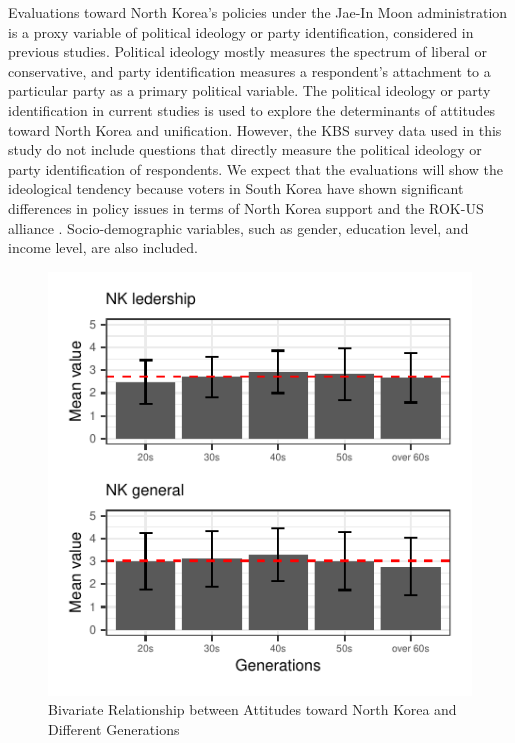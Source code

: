 \documentclass[letterpaper,9pt,twocolumn,twoside,]{pinp}
\begin{document}
Evaluations toward North Korea's policies under the Jae-In Moon
administration is a proxy variable of political ideology or party
identification, considered in previous studies. Political ideology
mostly measures the spectrum of liberal or conservative, and party
identification measures a respondent's attachment to a particular party
as a primary political variable. The political ideology or party
identification in current studies is used to explore the determinants of
attitudes toward North Korea and unification. However, the KBS survey
data used in this study do not include questions that directly measure
the political ideology or party identification of respondents. We expect
that the evaluations will show the ideological tendency because voters
in South Korea have shown significant differences in policy issues in
terms of North Korea support and the ROK-US alliance
\citep{Parketal2012}. Socio-demographic variables, such as gender,
education level, and income level, are also included.

\begin{figure}[htbp]

{\centering \includegraphics{manuscript_files/figure-latex/fig7-1} 

}

\caption{\label{fig7} Bivariate Relationship between Attitudes toward North Korea and Different Generations}\label{fig:fig7}
\end{figure}
\end{document}
